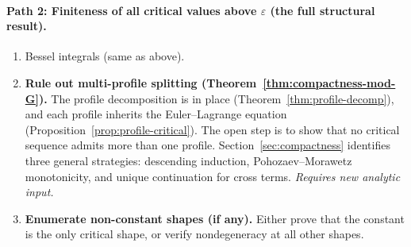 \documentclass[12pt]{article}
\theoremstyle{definition}
\theoremstyle{remark}
\begin{document}
\paragraph{Path 2: Finiteness of all critical values above
$\varepsilon$ (the full structural result).}
\begin{enumerate}[leftmargin=2em]
  \item Bessel integrals (same as above).

  \item \textbf{Rule out multi-profile splitting
    (Theorem~\ref{thm:compactness-mod-G}).}
    The profile decomposition is in place
    (Theorem~\ref{thm:profile-decomp}), and each profile inherits the
    Euler--Lagrange equation
    (Proposition~\ref{prop:profile-critical}).  The open step is to
    show that no critical sequence admits more than one profile.
    Section~\ref{sec:compactness} identifies three general strategies:
    descending induction, Pohozaev--Morawetz monotonicity, and unique
    continuation for cross terms.  \emph{Requires new analytic input.}

  \item \textbf{Enumerate non-constant shapes (if any).}  Either prove
    that the constant is the only critical shape, or verify
    nondegeneracy at all other shapes.
\end{enumerate}

\end{document}
